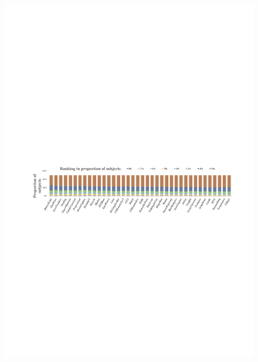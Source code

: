 \documentclass[10pt,journal,compsoc]{IEEEtran}
\begin{document}
\begin{figure}
	\begin{center}
		\centerline{\includegraphics[width=2\columnwidth]{figures/database/direction-consistence-distribution1}}%
	\end{center}
\end{figure}
\end{document}

